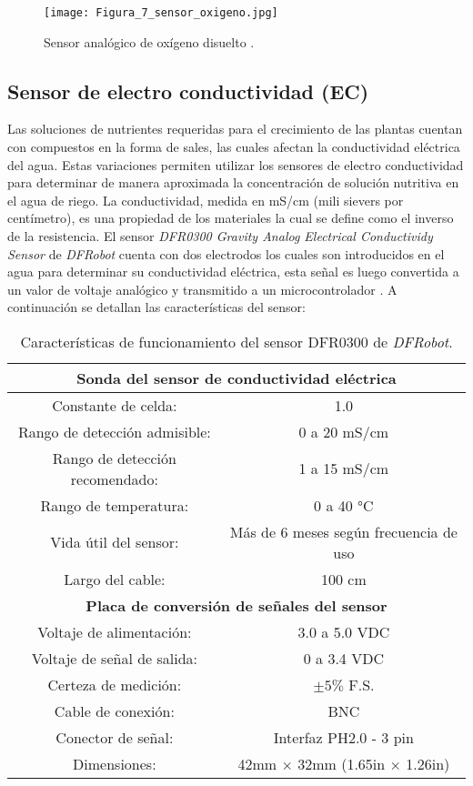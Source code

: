 \begin{figure}[H]
	\centering
	\texttt{[image: Figura\_7\_sensor\_oxigeno.jpg]}
	\caption{Sensor analógico de oxígeno disuelto \cite{DFRobot_DOsensor}.}
	\label{fig:mesh7}
\end{figure}


\subsection{Sensor de electro conductividad (EC)}
Las soluciones de nutrientes requeridas para el crecimiento de las plantas cuentan con compuestos en la forma de sales, las cuales afectan la conductividad eléctrica del agua. Estas variaciones permiten utilizar los sensores de electro conductividad para determinar de manera aproximada la concentración de solución nutritiva en el agua de riego. La conductividad, medida en mS/cm (mili sievers por centímetro), es una propiedad de los materiales la cual se define como el inverso de la resistencia. El sensor \textit{DFR0300 Gravity Analog Electrical Conductividy Sensor} de \textit{DFRobot} cuenta con dos electrodos los cuales son introducidos en el agua para determinar su conductividad eléctrica, esta señal es luego convertida a un valor de voltaje analógico y transmitido a un microcontrolador \cite{DFRobot_ECsensor}. A continuación se detallan las características del sensor:

\begin{table}[H]
	\centering
	\begin{tabular}{|c|c|}
		\hline
		\multicolumn{2}{|c|}{\textbf{Sonda del sensor de conductividad eléctrica}}\\ \hline
		Constante de celda: & 1.0 \\ \hline
		Rango de detección admisible: & 0 a 20 mS/cm \\ \hline
		Rango de detección recomendado: & 1 a 15 mS/cm \\ \hline
		Rango de temperatura: & 0 a 40 °C \\ \hline
		Vida útil del sensor: & Más de 6 meses según frecuencia de uso \\ \hline
		Largo del cable: & 100 cm \\ \hline
		\multicolumn{2}{|c|}{\textbf{Placa de conversión de señales del sensor}}\\ \hline 
		Voltaje de alimentación: & 3.0 a 5.0 VDC \\ \hline
		Voltaje de señal de salida: & 0 a 3.4 VDC \\ \hline
		Certeza de medición: & $\pm 5\%$ F.S. \\ \hline
		Cable de conexión: & BNC \\ \hline
		Conector de señal: & Interfaz PH2.0 - 3 pin \\ \hline
		Dimensiones: & 42mm $\times$ 32mm (1.65in $\times$ 1.26in) \\ \hline
	\end{tabular}
	\caption{Características de funcionamiento del sensor DFR0300 de \textit{DFRobot}.}
	\label{Cuadro2}
\end{table}

